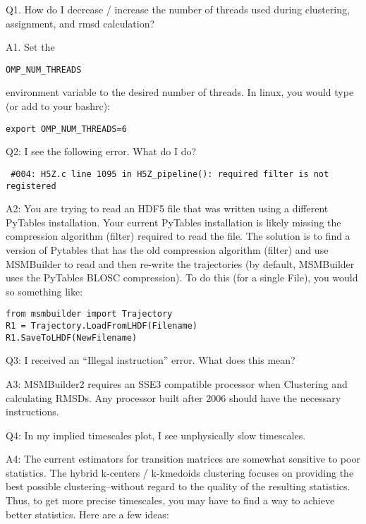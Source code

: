 \documentclass[12pt]{article}
\begin{document}
Q1.  How do I decrease / increase the number of threads used during clustering, assignment, and rmsd calculation?

A1.  Set the \begin{verbatim}OMP_NUM_THREADS\end{verbatim} environment variable to the desired number of threads.  In linux, you would type (or add to your bashrc):
\begin{verbatim}
export OMP_NUM_THREADS=6 
\end{verbatim}

\vspace{5mm}

Q2:  I see the following error.  What do I do?
\begin{verbatim}
 #004: H5Z.c line 1095 in H5Z_pipeline(): required filter is not registered
\end{verbatim}

A2:  You are trying to read an HDF5 file that was written using a different PyTables installation.  Your current PyTables installation is likely missing the compression algorithm (filter) required to read the file.  The solution is to find a version of Pytables that has the old compression algorithm (filter) and use MSMBuilder to read and then re-write the trajectories (by default, MSMBuilder uses the PyTables BLOSC compression).  To do this (for a single File), you would so something like:

\begin{verbatim}
from msmbuilder import Trajectory
R1 = Trajectory.LoadFromLHDF(Filename)
R1.SaveToLHDF(NewFilename)
\end{verbatim}

\vspace{5mm}

Q3: I received an “Illegal instruction” error.  What does this mean?

A3:  MSMBuilder2 requires an SSE3 compatible processor when Clustering and calculating RMSDs.  Any processor built after 2006 should have the necessary instructions.  

\vspace{5mm}

Q4:  In my implied timescales plot, I see unphysically slow timescales.  

A4:  The current estimators for transition matrices are somewhat sensitive to poor statistics.  The hybrid k-centers / k-kmedoids clustering focuses on providing the best possible clustering--without regard to the quality of the resulting statistics.  Thus, to get more precise timescales, you may have to find a way to achieve better statistics.  Here are a few ideas:
\end{document}
